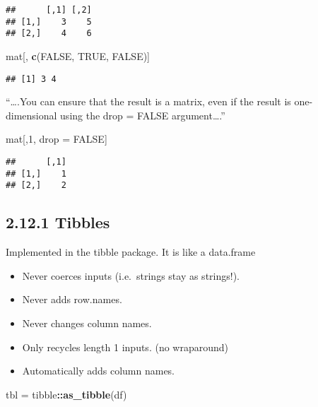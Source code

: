 \documentclass[]{article}
\newenvironment{Shaded}{\begin{snugshade}}{\end{snugshade}}
\newcommand{\DecValTok}[1]{\textcolor[rgb]{0.00,0.00,0.81}{#1}}
\newcommand{\KeywordTok}[1]{\textcolor[rgb]{0.13,0.29,0.53}{\textbf{#1}}}
\newcommand{\NormalTok}[1]{#1}
\newcommand{\OperatorTok}[1]{\textcolor[rgb]{0.81,0.36,0.00}{\textbf{#1}}}
\newcommand{\OtherTok}[1]{\textcolor[rgb]{0.56,0.35,0.01}{#1}}
\newcommand{\StringTok}[1]{\textcolor[rgb]{0.31,0.60,0.02}{#1}}
\providecommand{\tightlist}{%
  \setlength{\itemsep}{0pt}\setlength{\parskip}{0pt}}
\begin{document}
\begin{verbatim}
##      [,1] [,2]
## [1,]    3    5
## [2,]    4    6
\end{verbatim}

\begin{Shaded}
\begin{Highlighting}[]
\NormalTok{mat[, }\KeywordTok{c}\NormalTok{(}\OtherTok{FALSE}\NormalTok{, }\OtherTok{TRUE}\NormalTok{, }\OtherTok{FALSE}\NormalTok{)]}
\end{Highlighting}
\end{Shaded}

\begin{verbatim}
## [1] 3 4
\end{verbatim}

``\ldots{}.You can ensure that the result is a matrix, even if the
result is one-dimensional using the drop = FALSE argument\ldots{}.''

\begin{Shaded}
\begin{Highlighting}[]
\NormalTok{mat[,}\DecValTok{1}\NormalTok{, drop =}\StringTok{ }\OtherTok{FALSE}\NormalTok{]}
\end{Highlighting}
\end{Shaded}

\begin{verbatim}
##      [,1]
## [1,]    1
## [2,]    2
\end{verbatim}

\hypertarget{tibbles}{%
\subsection{2.12.1 Tibbles}\label{tibbles}}

Implemented in the tibble package. It is like a data.frame

\begin{itemize}
\tightlist
\item
  Never coerces inputs (i.e.~strings stay as strings!).
\item
  Never adds row.names.
\item
  Never changes column names.
\item
  Only recycles length 1 inputs. (no wraparound)
\item
  Automatically adds column names.
\end{itemize}

\begin{Shaded}
\begin{Highlighting}[]
\NormalTok{tbl =}\StringTok{ }\NormalTok{tibble}\OperatorTok{::}\KeywordTok{as_tibble}\NormalTok{(df)}
\end{Highlighting}
\end{Shaded}
\end{document}
